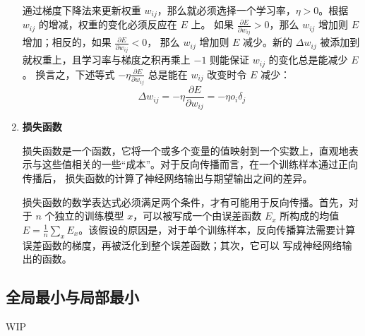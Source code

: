 \documentclass[../studies-ml.tex]{subfiles}
\begin{document}
\begin{enumerate}[I]
        通过梯度下降法来更新权重 $w_{ij}$，那么就必须选择一个学习率，$\eta > 0$。根据 $w_{ij}$ 的增减，权重的变化必须反应在 $E$ 上。
        如果 $\frac{\partial E}{\partial w_{ij}} > 0$，那么 $w_{ij}$ 增加则 $E$ 增加；相反的，如果 $\frac{\partial E}{\partial w_{ij}} < 0$，
        那么 $w_{ij}$ 增加则 $E$ 减少。新的 $\Delta w_{ij}$ 被添加到就权重上，且学习率与梯度之积再乘上 $-1$ 则能保证 $w_{ij}$ 的变化总是能减少 $E$。
        换言之，下述等式 $-\eta \frac{\partial E}{\partial w_{ij}}$ 总是能在 $w_{ij}$ 改变时令 $E$ 减少：
        \[
          \Delta w_{ij} = -\eta \frac{\partial E}{\partial w_{ij}} = -\eta o_i \delta_j
        \]

  \item \textbf{损失函数}

        损失函数是一个函数，它将一个或多个变量的值映射到一个实数上，直观地表示与这些值相关的一些“成本”。对于反向传播而言，在一个训练样本通过正向传播后，
        损失函数的计算了神经网络输出与期望输出之间的差异。

        损失函数的数学表达式必须满足两个条件，才有可能用于反向传播。首先，对于 $n$ 个独立的训练模型 $x$，可以被写成一个由误差函数 $E_x$ 所构成的均值
        $E = \frac{1}{n} \sum_x E_x$。该假设的原因是，对于单个训练样本，反向传播算法需要计算误差函数的梯度，再被泛化到整个误差函数；其次，它可以
        写成神经网络输出的函数。

\end{enumerate}

\newpage
\subsection{全局最小与局部最小}

WIP
\end{document}
